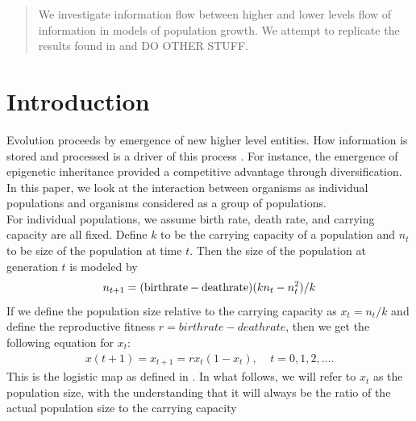 \documentclass[conference]{IEEEtran}
\begin{document}
\maketitle

\begin{abstract}
We investigate information flow between higher and lower levels flow of information in models of population growth. 
 We attempt to replicate the results found in \cite{Walker} and DO OTHER STUFF. 
\end{abstract}





%
\IEEEpeerreviewmaketitle



\section{Introduction}
\noindent Evolution proceeds by emergence of new higher level entities.   How information is stored and processed is a driver of this process \cite{Walker}.   For instance, the emergence of epigenetic inheritance provided a competitive advantage through diversification.  
In this paper, we look at the interaction between organisms as individual  populations and organisms considered as a group of populations. \\ 

\noindent For individual populations, we assume birth rate, death rate, and  carrying capacity are all fixed.  Define $k$ to be the carrying capacity of a population and $n_t$ to be size of the population at time $t$. Then the size of the population at generation $t$ is modeled by 
\begin{eqnarray}
n_{t+1} = (\textnormal{birthrate} - \textnormal{deathrate}) (k n_t - n_t^2) / k 
\end{eqnarray}
If we define the population size relative to the carrying capacity as  $x_t = n_t / k$ and define the reproductive fitness  $r = birthrate - deathrate$, then we  get the following equation for $x_t$: 
\begin{eqnarray}
x(t+1) = x_{t+1} = r  x_t (1 - x_t), \ \ \ \ \  t=0, 1, 2, \ldots . 
\label{logistic}
\end{eqnarray}
This is the logistic map as defined in \cite{Mitchell}.  In what follows, we will refer to $x_t$ as the population size, with the understanding that it will always be the ratio of the actual population size to the carrying capacity
\end{document}
